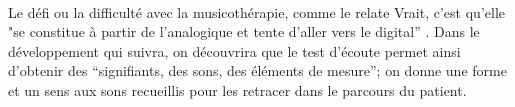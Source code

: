 \\
 Le défi ou la difficulté avec la musicothérapie, comme le relate Vrait, 
 c'est qu'elle  "se constitue à partir 
 de l'analogique et tente d'aller vers le digital'' 
 \autocite[24]{vrait_musicotherapie_2018}.
Dans le développement qui suivra, on découvrira que le test d'écoute permet ainsi d'obtenir des   
\enquote{signifiants, des sons, des éléments de mesure}; on donne
une forme et un sens aux sons recueillis pour les retracer dans le
parcours du patient.
\\



